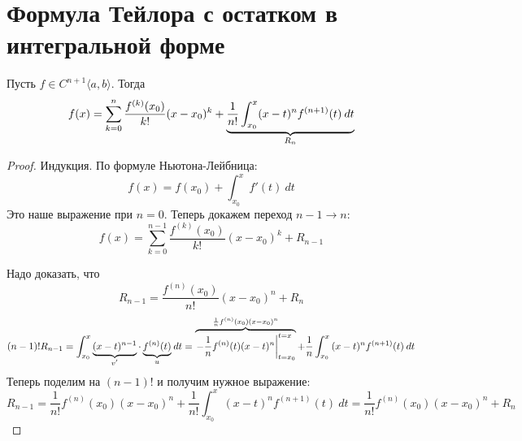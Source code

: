 \section{Формула Тейлора с остатком в интегральной форме}

\begin{theorem}
    Пусть $f \in C^{n + 1}\langle a, b \rangle$. Тогда
    \begin{equation*}
    f(x) =
    \sum_{k = 0}^{n} \frac{f^{(k)}(x_0)}{k!}(x - x_0)^k +
    \underbrace{\frac{1}{n!}\int_{x_0}^{x} (x - t)^n f^{(n + 1)}(t) \: dt}_{\mathclap{R_n}}
    \end{equation*}
\end{theorem}
\begin{proof}
    Индукция. По формуле Ньютона-Лейбница:
    \begin{equation*}
      f(x) = f(x_0) + \int_{x_0}^{x} f'(t) \: dt
    \end{equation*}
    Это наше выражение при $n = 0$. Теперь докажем переход $n - 1 \to n$:
    \begin{equation*}
      f(x) = \sum_{k = 0}^{n - 1} \frac{f^{(k)}(x_0)}{k!}(x - x_0)^{k} + R_{n - 1}
    \end{equation*}

    Надо доказать, что
    \begin{equation*}
      R_{n - 1} = \frac{f^{(n)}(x_0)}{n!}(x - x_0)^n + R_n
    \end{equation*}
    \begin{equation*}
      (n - 1)!R_{n - 1} =
      \int_{{x_0}}^{{x}} {\underbrace{(x - t)^{n - 1}}_{\mathclap{v'}}\cdot \underbrace{f^{(n)}(t)}_{\mathclap{u}}} \: d{t} =
      \overbrace{\left.-\frac{1}{n}f^{(n)}(t)(x - t)^n\right|_{t = x_0}^{t = x}}^{\mathclap{\frac{1}{n}f^{(n)}(x_0)(x - x_0)^n}}
      + \frac{1}{n} \int_{{x_0}}^{{x}} {(x - t)^n f^{(n + 1)}(t)} \: d{t}
    \end{equation*}
    Теперь поделим на $(n - 1)!$ и получим нужное выражение:
    \begin{equation*}
      R_{n - 1} =
      \frac{1}{n!}f^{(n)}(x_0)(x - x_0)^{n} +
      \frac{1}{n!} \int_{{x_0}}^{{x}} {(x - t)^n f^{(n + 1)}(t)} \: d{t}
      =
      \frac{1}{n!}f^{(n)}(x_0)(x - x_0)^{n} +
      R_n
    \end{equation*}
\end{proof}